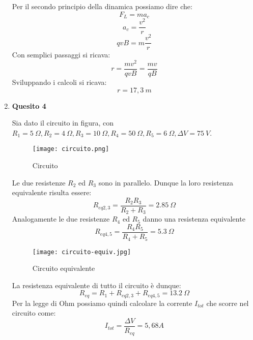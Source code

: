 \documentclass[a4paper,12pt]{article}
\begin{document}
\begin{enumerate}
Per il secondo principio della dinamica possiamo dire che:
\begin{equation}F_L=ma_c\end{equation}
\begin{equation}a_c=\frac{v^2}{r}\end{equation}
\begin{equation}qvB=m\frac{v^2}{r}\end{equation}
Con semplici passaggi si ricava:
\begin{equation}r=\frac{mv^2}{qvB}=\frac{mv}{qB}\end{equation}
Sviluppando i calcoli si ricava:
\begin{equation}r=17,3\ m\end{equation}

\item \textbf{Quesito 4}

Sia dato il circuito in figura, con $R_1 = 5\ \Omega, R_2 = 4\ \Omega, R_3 = 10\ \Omega, R_4 = 50\ \Omega,  R_5 = 6\ \Omega, \Delta V=75\ V$. 

\begin{figure}[H]
\centering
\texttt{[image: circuito.png]}
\caption {Circuito}
\end{figure}

Le due resistenze $R_2$ ed $R_3$ sono in parallelo. Dunque la loro resistenza equivalente risulta essere:
\begin{equation}R_{eq2,3}=\frac{R_2R_3}{R_2+R_3}=2.85\ \Omega\end{equation}
Analogamente le due resistenze $R_4$ ed $R_5$ danno una resistenza equivalente
\begin{equation}R_{eq4,5}=\frac{R_4R_5}{R_4+R_5}=5.3\ \Omega\end{equation}

\begin{figure}[H]
\centering
\texttt{[image: circuito-equiv.jpg]}
\caption {Circuito equivalente}
\end{figure}

La resistenza equivalente di tutto il circuito è dunque:
\begin{equation}R_{eq}=R_1+R_{eq2,3}+R_{eq4,5}=13.2\ \Omega\end{equation}
Per la legge di Ohm possiamo quindi calcolare la corrente $I_{tot}$ che scorre nel circuito come:
\begin{equation}I_{tot}=\frac{\Delta V}{R_{eq}}=5,68A\end{equation}


\end{enumerate}
\end{document}

